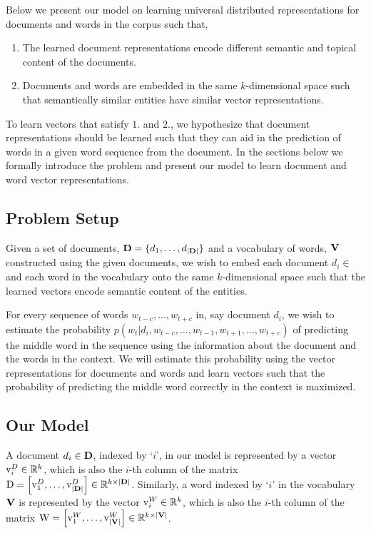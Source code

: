 Below we present our model on learning universal distributed representations for documents and words in the corpus such that,
\begin{enumerate}
\item The learned document representations encode different semantic and topical content of the documents.
\item Documents and words are embedded in the same $k$-dimensional space such that semantically similar entities have similar vector representations.
\end{enumerate}
To learn vectors that satisfy $1.$ and $2.$, we hypothesize that document representations should be learned such that they can aid in the prediction of words in a given word sequence from the document. In the sections below we formally introduce the problem and present our model to learn document and word vector representations.

\subsection{Problem Setup}
Given a set of documents, $\mathbf{D}=\{d_{1}, \ldots, d_{|\mathbf{D}|}\}$ and a vocabulary of words, $\mathbf{V}$ constructed using the given documents, we wish to embed each document $d_{i} \in$ \setD and each word in the vocabulary onto the same $k$-dimensional space such that the learned vectors encode semantic content of the entities. 

For every sequence of words $w_{t-c}, \ldots, w_{t+c}$ in, say document $d_{i}$, we wish to estimate the probability $p(w_{t}|d_{i}, w_{t-c}, \ldots, w_{t-1}, w_{t+1}, \ldots, w_{t+c})$ of predicting the middle word in the sequence using the information about the document and the words in the context. 
We will estimate this probability using the vector representations for documents and words and learn vectors such that the probability of predicting the middle word correctly in the context is maximized.

\subsection{Our Model}
\label{sec:docem_ourmodel}
A document $d_{i} \in \mathbf{D}$, indexed by `$i$', in our model is represented by a vector $\mathrm{v}^{D}_{i} \in \mathbb{R}^{k}$, which is also the $i$-th column of the matrix $\mathrm{D} = \left[\mathrm{v}^{D}_{1}, \ldots, \mathrm{v}^{D}_{|\mathbf{D}|}\right] \in \mathbb{R}^{k \times |\mathbf{D}|}$. 
Similarly, a word indexed by `$i$' in the vocabulary $\mathbf{V}$ is represented by the vector $\mathrm{v}^{W}_{i} \in \mathbb{R}^{k}$, which is also the $i$-th column of the matrix $\mathrm{W} = \left[\mathrm{v}^{W}_{1}, \ldots, \mathrm{v}^{W}_{|\mathbf{V}|}\right] \in \mathbb{R}^{k \times |\mathbf{V}|}$.

